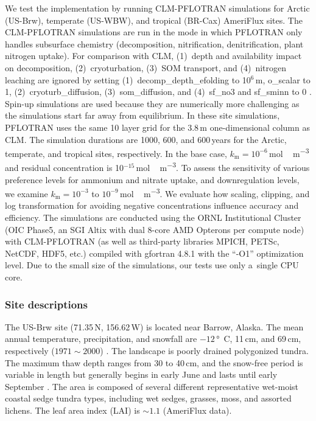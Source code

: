 \documentclass[gmdd, online, hvmath]{copernicus}
\begin{document}
      We test the implementation by running CLM-PFLOTRAN simulations for
      Arctic (US-Brw), temperate (US-WBW), and tropical (BR-Cax) AmeriFlux
      sites. The CLM-PFLOTRAN simulations are run in the mode in which
      PFLOTRAN only handles subsurface chemistry (decomposition,
      nitrification, denitrification, plant nitrogen uptake). For comparison
      with CLM, (1)~depth and  availability impact on
      decomposition, (2)~cryoturbation, (3)~SOM transport, and (4)~nitrogen
      leaching are ignored by setting (1)~decomp\_depth\_efolding to
      10$^6$\,m, o\_scalar to 1, (2)~cryoturb\_diffusion,
      (3)~som\_diffusion, and (4)~sf\_no3 and sf\_sminn to 0
      \citep{Oleson2013}. Spin-up simulations are used because they are
      numerically more challenging as the simulations start far away from
      equilibrium. In these site simulations, PFLOTRAN uses the same 10
      layer grid for the 3.8\,m one-dimensional column as CLM. The
      simulation durations are 1000, 600, and 600\,years for the Arctic,
      temperate, and tropical sites, respectively.  In the base case,
      $k_\mathrm{m}=10^{-6}$\,\unit{mol\,m^{-3}} and residual concentration
      is 10$^{-15}$\,\unit{mol\,m^{-3}}. To assess the sensitivity of
      various preference levels for ammonium and nitrate uptake, and
      downregulation levels, we examine $k_\mathrm{m}=10^{-3}$ to
      $10^{-9}$\,\unit{mol\,m^{-3}}. We evaluate how scaling, clipping, and
      log transformation for avoiding negative concentrations influence
      accuracy and efficiency.  The simulations are conducted using the ORNL
      Institutional Cluster (OIC Phase5, an SGI Altix with dual 8-core AMD
      Opterons per compute node) with CLM-PFLOTRAN (as well as third-party
      libraries MPICH, PETSc, NetCDF, HDF5, etc.) compiled with gfortran
      4.8.1 with the ``-O1'' optimization level.  Due to the small size of
      the simulations, our tests use only a~single CPU core.



\subsubsection{Site descriptions}%

      The US-Brw site (71.35{\degree}\,N, 156.62{\degree}\,W) is located
      near Barrow, Alaska. The mean annual temperature, precipitation, and
      snowfall are $-12$\,\unit{\degree C}, 11\,\unit{cm}, and
      69\,\unit{cm}, respectively ($1971 \sim 2000$) \citep{Lara2012}. The
      landscape is poorly drained polygonized tundra. The maximum thaw depth
      ranges from 30 to 40\,\unit{cm}, and the snow-free period is variable
      in length but generally begins in early June and lasts until early
      September \citep{Hinkel2003}. The area is composed of several
      different representative wet-moist coastal sedge tundra types,
      including wet sedges, grasses, moss, and assorted lichens. The leaf
      area index (LAI) is $\sim 1.1$ (AmeriFlux data).
\end{document}

